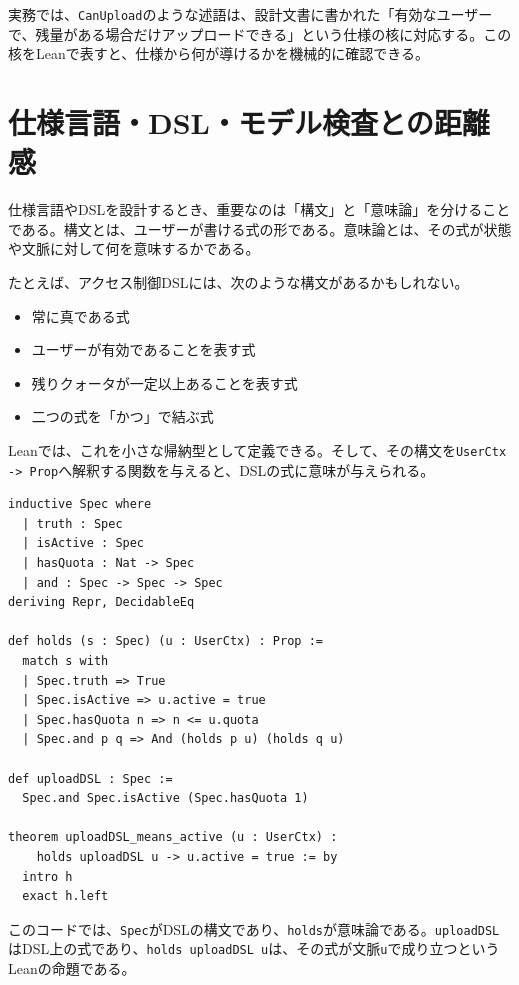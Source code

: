 \begin{softwarebox}
実務では、\texttt{CanUpload}のような述語は、設計文書に書かれた「有効なユーザーで、残量がある場合だけアップロードできる」という仕様の核に対応する。この核をLeanで表すと、仕様から何が導けるかを機械的に確認できる。
\end{softwarebox}

\section{仕様言語・DSL・モデル検査との距離感}

仕様言語やDSLを設計するとき、重要なのは「構文」と「意味論」を分けることである。構文とは、ユーザーが書ける式の形である。意味論とは、その式が状態や文脈に対して何を意味するかである。

たとえば、アクセス制御DSLには、次のような構文があるかもしれない。

\begin{itemize}
  \item 常に真である式
  \item ユーザーが有効であることを表す式
  \item 残りクォータが一定以上あることを表す式
  \item 二つの式を「かつ」で結ぶ式
\end{itemize}

Leanでは、これを小さな帰納型として定義できる。そして、その構文を\texttt{UserCtx -> Prop}へ解釈する関数を与えると、DSLの式に意味が与えられる。

\begin{listing}[htbp]
\begin{verbatim}
inductive Spec where
  | truth : Spec
  | isActive : Spec
  | hasQuota : Nat -> Spec
  | and : Spec -> Spec -> Spec
deriving Repr, DecidableEq

def holds (s : Spec) (u : UserCtx) : Prop :=
  match s with
  | Spec.truth => True
  | Spec.isActive => u.active = true
  | Spec.hasQuota n => n <= u.quota
  | Spec.and p q => And (holds p u) (holds q u)

def uploadDSL : Spec :=
  Spec.and Spec.isActive (Spec.hasQuota 1)

theorem uploadDSL_means_active (u : UserCtx) :
    holds uploadDSL u -> u.active = true := by
  intro h
  exact h.left
\end{verbatim}
\caption{小さな仕様DSLとその意味論}
\label{lst:ch33_spec_dsl}
\end{listing}

このコードでは、\texttt{Spec}がDSLの構文であり、\texttt{holds}が意味論である。\texttt{uploadDSL}はDSL上の式であり、\texttt{holds uploadDSL u}は、その式が文脈\texttt{u}で成り立つというLeanの命題である。

